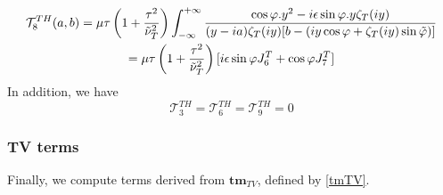\begin{multline}
\mathcal{T}_8^{TH}(a,b)=\mu\tau\left(1+\frac{\tau^2}{\nuti_T^2}\right)\int_{-\infty}^{+\infty} \frac{\cos\varphi.y^2-i\epsilon\sin\varphi.y\zeta_T(iy)}{(y-ia)\zeta_T(iy)\lbrack b-(iy\cos \varphi+ \zeta_T(iy)\sin\phiti) \rbrack}\\
\hfill =\mu\tau\left(1+\frac{\tau^2}{\nuti_T^2}\right)\lbrack i\epsilon\sin\varphi J_6^T+\cos\varphi J_7^T\rbrack  \hfill
\end{multline}
In addition, we have
$$ \mathcal{T}_3^{TH}=\mathcal{T}_6^{TH}=\mathcal{T}_9^{TH}=0 $$

\subsubsection{TV terms}
Finally, we compute terms derived from $\mathbf{tm}_{TV}$, defined by \eqref{tmTV}.

